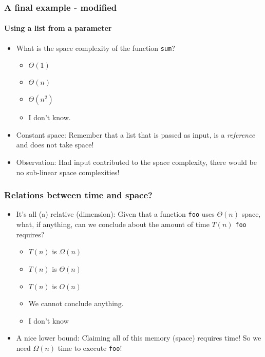 \begin{frame}
	\frametitle{A final example - modified}
	\framesubtitle{Using a list from a parameter}
						\begin{itemize}
				\item What is the space complexity of the function \texttt{sum}?
			\begin{itemize}
				\item $\Theta(1)$
				\item $\Theta(n)$ 
				\item $\Theta(n^2)$
				\item I don't know.
			\end{itemize}
				\item Constant space:
		Remember that a list that is passed as input, is a \textit{reference} and does not take space!
				\item Observation:
			Had input contributed to the space complexity, there would be no sub-linear space complexities!	
		\end{itemize}	
		
				

\end{frame}

\begin{frame}
	\frametitle{Relations between time and space?}

		\begin{itemize}
		\item It's all (a) relative (dimension):
		Given that a function \texttt{foo} uses $\Theta(n)$ space, what, if anything, can we conclude about the amount of
		time $T(n)$ \texttt{foo} requires?
			\begin{itemize}
				\item $T(n)$ is $\Omega(n)$
				\item $T(n)$ is $\Theta(n)$
				\item $T(n)$ is $O(n)$
				\item We cannot conclude anything.
				\item I don't know
			\end{itemize}
		\item A nice lower bound:
			Claiming all of this memory (space) requires time! So we need $\Omega(n)$ time to execute \texttt{foo}!
		\end{itemize}
\end{frame}

